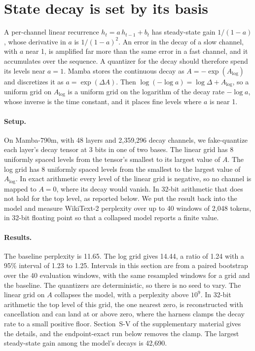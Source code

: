 \documentclass[journal]{IEEEtran}
\begin{document}
\section{State decay is set by its basis}\label{sec:decay}

A per-channel linear recurrence $h_t = a\,h_{t-1} + b_t$ has steady-state gain $1/(1-a)$, whose
derivative in $a$ is $1/(1-a)^2$. An error in the decay of a slow channel, with $a$ near 1, is
amplified far more than the same error in a fast channel, and it accumulates over the sequence. A
quantizer for the decay should therefore spend its levels near $a = 1$. Mamba \citep{gu2024mamba}
stores the continuous decay as $A = -\exp(A_{\log})$ and discretizes it as $a = \exp(\Delta A)$.
Then $\log(-\log a) = \log\Delta + A_{\log}$, so a uniform grid on $A_{\log}$ is a uniform grid on
the logarithm of the decay rate $-\log a$, whose inverse is the time constant, and it places fine
levels where $a$ is near 1.

\paragraph{Setup.} On Mamba-790m, with 48 layers and 2{,}359{,}296 decay channels, we
fake-quantize each layer's decay tensor at 3 bits in one of two bases. The linear grid has 8
uniformly spaced levels from the tensor's smallest to its largest value of $A$. The log grid has 8
uniformly spaced levels from the smallest to the largest value of $A_{\log}$. In exact arithmetic every
level of the linear grid is negative, so no channel is mapped to $A = 0$, where its decay would
vanish. In 32-bit arithmetic that does not hold for the top level, as reported below.
We put the result back into the model and measure WikiText-2 perplexity over up to 40 windows of
2{,}048 tokens, in 32-bit floating point so that a collapsed model reports a finite value.

\paragraph{Results.} The baseline perplexity is 11.65. The log grid gives 14.44, a ratio of 1.24 with a 95\%
interval of 1.23 to 1.25. Intervals in this section are from a paired bootstrap over the 40
evaluation windows, with the same resampled windows for a grid and the baseline. The quantizers
are deterministic, so there is no seed to vary. The linear grid
on $A$ collapses the model, with a perplexity above $10^{9}$. In 32-bit arithmetic the top level of this grid, the one nearest zero, is reconstructed
with cancellation and can land at or above zero, where the harness clamps the decay rate to a
small positive floor. Section~S-V of the supplementary material gives the details, and the
endpoint-exact run below removes the clamp. The
largest steady-state gain among the model's decays is 42{,}690.
\end{document}
